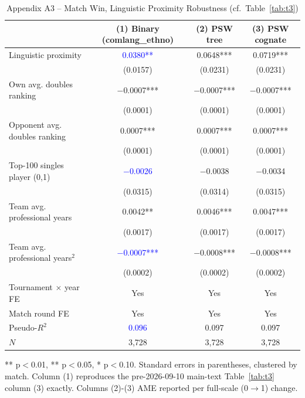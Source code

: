 \documentclass[10pt]{article}
\begin{document}
\begin{table}[htbp]
\centering
\caption{Appendix A3 -- Match Win, Linguistic Proximity Robustness (cf.\ Table~\ref{tab:t3}) \label{tab:a3}}
\begin{threeparttable}
\begin{tabular}{lccc}
\toprule
 & (1) Binary (comlang\_ethno) & (2) PSW tree & (3) PSW cognate \\
\midrule
Linguistic proximity & \textcolor{blue}{0.0380**} & 0.0648*** & 0.0719*** \\
 & (0.0157) & (0.0231) & (0.0231) \\
Own avg. doubles ranking & $-$0.0007*** & $-$0.0007*** & $-$0.0007*** \\
 & (0.0001) & (0.0001) & (0.0001) \\
Opponent avg. doubles ranking & 0.0007*** & 0.0007*** & 0.0007*** \\
 & (0.0001) & (0.0001) & (0.0001) \\
Top-100 singles player (0,1)& \textcolor{blue}{$-$0.0026} & $-$0.0038 & $-$0.0034 \\
 & (0.0315) & (0.0314) & (0.0315) \\
Team avg. professional years  & 0.0042** & 0.0046*** & 0.0047*** \\
 & (0.0017) & (0.0017) & (0.0017) \\
Team avg. professional years$^2$  & \textcolor{blue}{$-$0.0007***} & $-$0.0008*** & $-$0.0008*** \\
 & (0.0002) & (0.0002) & (0.0002) \\
\midrule
Tournament $\times$ year FE & Yes & Yes & Yes \\
Match round FE & Yes & Yes & Yes \\
Pseudo-$R^2$ & \textcolor{blue}{0.096} & 0.097 & 0.097 \\
$N$ & 3,728 & 3,728 & 3,728 \\
\bottomrule
\end{tabular}
\begin{tablenotes}
\small
\item *** p$<$0.01, ** p$<$0.05, * p$<$0.10. Standard errors in parentheses, clustered by match. Column (1) reproduces the pre-2026-09-10 main-text Table~\ref{tab:t3} column (3) exactly. Columns (2)-(3) AME reported per full-scale (0$\to$1) change.
\end{tablenotes}
\end{threeparttable}
\end{table}
\FloatBarrier
\end{document}
